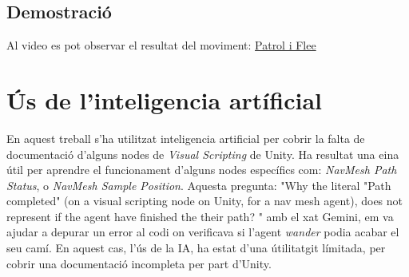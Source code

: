 \documentclass[10.5pt, stu, hidelinks, noendfloat]{apa7}
\begin{document}
\subsection{Demostració}

Al video es pot observar el resultat del moviment: \href{https://youtu.be/TVM16daaVkM}{Patrol i Flee}


\section{Ús de l'inteligencia artíficial}

En aquest treball s'ha utilitzat inteligencia artificial per cobrir la falta de documentació d'alguns nodes de \textit{Visual Scripting} de Unity. Ha resultat una eina útil per aprendre el funcionament d'alguns nodes específics com: \textit{NavMesh Path Status}, o \textit{NavMesh Sample Position}. 
Aquesta pregunta: "Why the literal "Path completed" (on a visual scripting node on Unity, for a nav mesh agent), does not represent if the agent have finished the their path? " amb el xat Gemini, em va ajudar a depurar un error al codi on verificava si l'agent \textit{wander} podia acabar el seu camí.
En aquest cas, l'ús de la IA, ha estat d'una útilitatgit límitada, per cobrir una documentació incompleta per part d'Unity.
\end{document}
